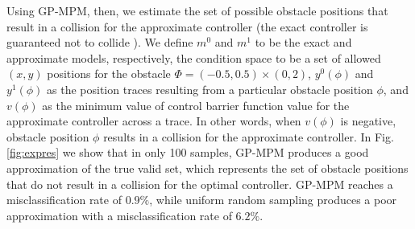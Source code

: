 \documentclass{amsart}
\begin{document}
Using GP-MPM, then, we estimate the set of possible obstacle positions that result in a collision for the approximate controller (the exact controller is guaranteed not to collide \cite{molnar23}). We define $m^0$ and $m^1$ to be the exact and approximate models, respectively, the condition space to be a set of allowed $(x,y)$ positions for the obstacle $\Phi = (-0.5,0.5)\times(0,2)$, $y^0(\phi)$ and $y^1(\phi)$ as the position traces resulting from a particular obstacle position $\phi$, and $v(\phi)$ as the minimum value of control barrier function value for the approximate controller across a trace. In other words, when $v(\phi)$ is negative, obstacle position $\phi$ results in a collision for the approximate controller. In Fig. \ref{fig:expres} we show that in only 100 samples, GP-MPM produces a good approximation of the true valid set, which represents the set of obstacle positions that do not result in a collision for the optimal controller. GP-MPM reaches a misclassification rate of $0.9\%$, while uniform random sampling produces a poor approximation with a misclassification rate of $6.2\%$.



\end{document}
